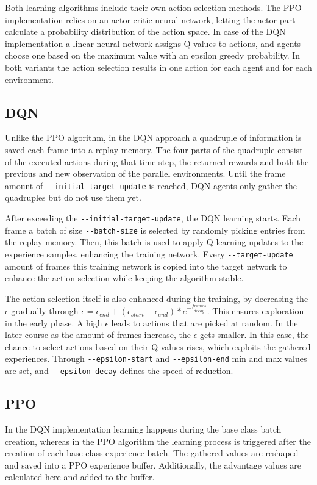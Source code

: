 Both learning algorithms include their own action selection methods. The PPO implementation relies on an actor-critic neural network, letting the actor part calculate a probability distribution of the action space. In case of the DQN implementation a linear neural network assigns Q values to actions, and agents choose one based on the maximum value with an epsilon greedy probability. In both variants the action selection results in one action for each agent and for each environment.

\subsection{DQN}
Unlike the PPO algorithm, in the DQN approach a quadruple of information is saved each frame into a replay memory. The four parts of the quadruple consist of the executed actions during that time step, the returned rewards and both the previous and new observation of the parallel environments. Until the frame amount of \verb|--initial-target-update| is reached, DQN agents only gather the quadruples but do not use them yet.

After exceeding the \verb|--initial-target-update|, the DQN learning starts. Each frame a batch of size \verb|--batch-size| is selected by randomly picking entries from the replay memory. Then, this batch is used to apply Q-learning updates to the experience samples, enhancing the training network. Every \verb|--target-update| amount of frames this training network is copied into the target network to enhance the action selection while keeping the algorithm stable.

The action selection itself is also enhanced during the training, by decreasing the $\epsilon$ gradually through $\epsilon = \epsilon_{end}+(\epsilon_{start}-\epsilon_{end})*e^{-\frac{frames}{decay}}$. This ensures exploration in the early phase. A high $\epsilon$ leads to actions that are picked at random. In the later course as the amount of frames increase, the $\epsilon$ gets smaller. In this case, the chance to select actions based on their Q values rises, which exploits the gathered experiences. Through \verb|--epsilon-start| and \verb|--epsilon-end| min and max values are set, and \verb|--epsilon-decay| defines the speed of reduction.

\subsection{PPO}
In the DQN implementation learning happens during the base class batch creation, whereas in the PPO algorithm the learning process is triggered after the creation of each base class experience batch. The gathered values are reshaped and saved into a PPO experience buffer. Additionally, the advantage values are calculated here and added to the buffer.

